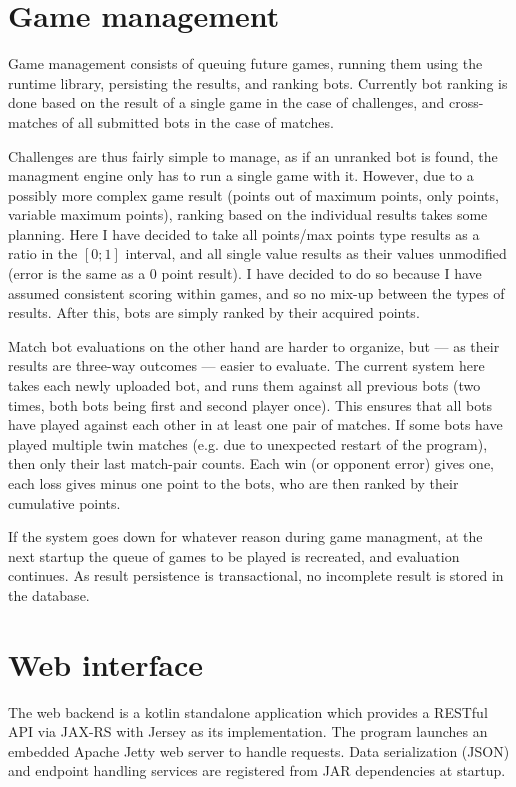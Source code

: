 	\section{Game management}

	Game management consists of queuing future games, running them using the runtime library, persisting the results, and ranking bots. Currently bot ranking is done based on the result of a single game in the case of challenges, and cross-matches of all submitted bots in the case of matches.
	
	Challenges are thus fairly simple to manage, as if an unranked bot is found, the managment engine only has to run a single game with it. However, due to a possibly more complex game result (points out of maximum points, only points, variable maximum points), ranking based on the individual results takes some planning. Here I have decided to take all points/max points type results as a ratio in the $[0;1]$ interval, and all single value results as their values unmodified (error is the same as a  0 point result). I have decided to do so because I have assumed consistent scoring within games, and so no mix-up between the types of results. After this, bots are simply ranked by their acquired points.
	
	Match bot evaluations on the other hand are harder to organize, but --- as their results are three-way outcomes --- easier to evaluate. The current system here takes each newly uploaded bot, and runs them against all previous bots (two times, both bots being first and second player once). This ensures that all bots have played against each other in at least one pair of matches. If some bots have played multiple twin matches (e.g. due to unexpected restart of the program), then only their last match-pair counts. Each win (or opponent error) gives one, each loss gives minus one point to the bots, who are then ranked by their cumulative points.
	
	If the system goes down for whatever reason during game managment, at the next startup the queue of games to be played is recreated, and evaluation continues. As result persistence is transactional, no incomplete result is stored in the database.

	\section{Web interface}
	
	The web backend is a kotlin standalone application which provides a RESTful API via JAX-RS with Jersey as its implementation. The program launches an embedded Apache Jetty web server to handle requests. Data serialization (JSON) and endpoint handling services are registered from JAR dependencies at startup.

